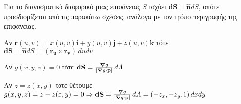 \begin{dfn}
  Για το διανυσματικό διαφορικό μιας επιφάνειας $S$ ισχύει $ \mathbf{dS} =
  \mathbf{\widehat{n}}dS $, οπότε προσδιορίζεται από τις παρακάτω σχέσεις, ανάλογα με τον τρόπο περιγραφής της επιφάνειας.
  \begin{myitemize}
    \item Αν $ \mathbf{r}(u,v) = x(u,v)\mathbf{i}+y(u,v)\mathbf{j}+z(u,v)\mathbf{k} $ 
      τότε $ \mathbf{dS} = \mathbf{\widehat{n}} dS = (\mathbf{r_{u}} \times 
      \mathbf{r_{v}}) \, du dv $ 
    \item Αν $ g(x,y,z)=0 $ τότε $ \mathbf{dS} = \frac{\grad g}{\abs{\grad g 
      \cdot \mathbf{p}}}\, dA $
    \item Αν $ z=z(x,y) $ τότε θέτουμε $ g(x,y,z)=z-z(x,y)=0 \Rightarrow \mathbf{dS} 
      = \frac{\grad g}{\abs{\grad g \cdot \mathbf{p}}}\, dA = (-z_{x},-z_{y},1) 
      \, dx dy $
  \end{myitemize}
\end{dfn}


